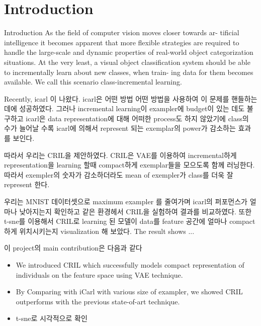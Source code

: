 \section{Introduction}
\label{sec:introduction}

Introduction
As the field of computer vision moves closer towards ar- tificial intelligence it becomes apparent that more flexible strategies are required to handle the large-scale and dynamic properties of real-world object categorization situations. At the very least, a visual object classification system should be able to incrementally learn about new classes, when train- ing data for them becomes available. We call this scenario class-incremental learning.

Recently, icarl 이 나왔다. icarl은 어떤 방법 어떤 방법을 사용하여 이 문제를 핸들하는데에 성공하였다. 그러나 incremental learning이 exampler에 budget이 있는 데도 불구하고 icarl은 data representation에 대해 어떠한 process도 하지 않았기에 class의 수가 늘어날 수록 icarl에 의해서 represent 되는 exemplar의 power가 감소하는 효과를 보인다.

따라서 우리는 CRIL을 제안하였다. CRIL은 VAE를 이용하여 incremental하게 representation을 learning 할때 compact하게 exemplar들을 모으도록 함께 러닝한다. 따라서 exempler의 숫자가 감소하더라도 mean of exempler가 class를 더욱 잘 represent 한다.

우리는 MNIST 데이터셋으로 maximum exampler  를 줄여가며 icarl의 퍼포먼스가 얼마나 낮아지는지 확인하고 같은 환경헤서 CRIL을 실험하여 결과를 비교하였다. 또한 t-sne를 이용해서 CRIL로 learning 된 모델이 data를 feature 공간에 얼마나 compact하게 위치시키는지 visualization 해 보았다. The result shows ...

이 project의 main contribution은 다음과 같다
\begin{itemize}
\item We introduced CRIL which successfully models compact representation of individuals on the feature space using VAE technique.
\item By Comparing with iCarl with various size of exampler, we showed CRIL outperforms with the previous state-of-art technique.
\item t-sne로 시각적으로 확인
\end{itemize}
